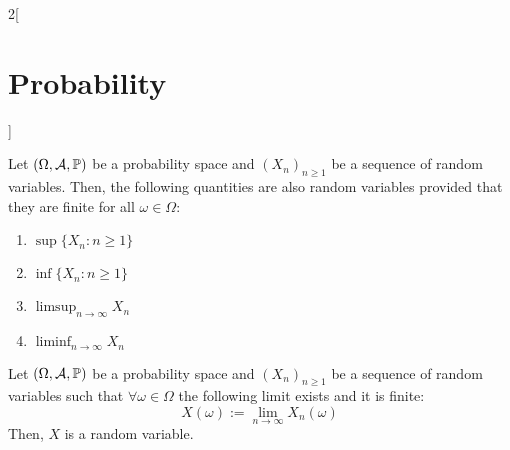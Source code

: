 \documentclass[../../../main.tex]{subfiles}
\begin{document}
\begin{multicols}{2}[\section{Probability}]
\begin{prop}
\begin{enumerate}
    \end{enumerate}
  \end{prop}
  \begin{prop}
    Let $(\Omega,\mathcal{A},\mathbb{P})$ be a probability space and $(X_n)_{n\geq 1}$ be a sequence of random variables. Then, the following quantities are also random variables provided that they are finite for all $\omega\in\Omega$:
    \begin{enumerate}
      \item $\sup\{X_n:n\geq 1\}$
      \item $\inf\{X_n:n\geq 1\}$
      \item $\displaystyle\limsup_{n\to\infty}X_n$
      \item $\displaystyle\liminf_{n\to\infty} X_n$
    \end{enumerate}
  \end{prop}
  \begin{corollary}
    Let $(\Omega,\mathcal{A},\mathbb{P})$ be a probability space and $(X_n)_{n\geq 1}$ be a sequence of random variables such that $\forall\omega\in\Omega$ the following limit exists and it is finite: $$X(\omega):=\lim_{n\to\infty}X_n(\omega)$$
    Then, $X$ is a random variable.
  \end{corollary}

\end{multicols}
\end{document}

